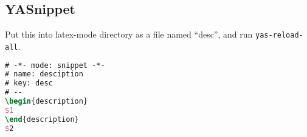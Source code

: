 \subsection{YASnippet}
Put this into latex-mode directory as a file named ``desc'', and run \texttt{yas-reload-all}.
\begin{lstlisting}[language=tex]
# -*- mode: snippet -*-
# name: desciption
# key: desc
# --
\begin{description}
$1
\end{description}
$2
\end{lstlisting}


